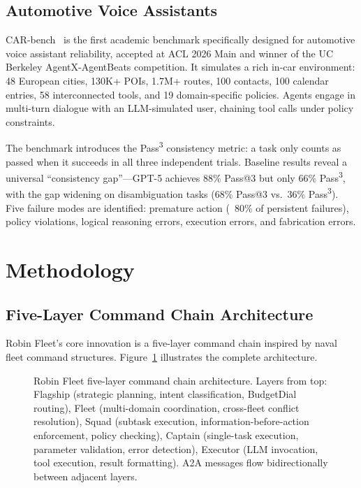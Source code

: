 \documentclass{article}
\begin{document}
\subsection{Automotive Voice Assistants}

CAR-bench~\cite{carbench2026} is the first academic benchmark specifically designed for automotive voice assistant reliability, accepted at ACL 2026 Main and winner of the UC Berkeley AgentX-AgentBeats competition. It simulates a rich in-car environment: 48 European cities, 130K+ POIs, 1.7M+ routes, 100 contacts, 100 calendar entries, 58 interconnected tools, and 19 domain-specific policies. Agents engage in multi-turn dialogue with an LLM-simulated user, chaining tool calls under policy constraints.

The benchmark introduces the Pass\textsuperscript{3} consistency metric: a task only counts as passed when it succeeds in all three independent trials. Baseline results reveal a universal ``consistency gap''---GPT-5 achieves 88\% Pass@3 but only 66\% Pass\textsuperscript{3}, with the gap widening on disambiguation tasks (68\% Pass@3 vs.\ 36\% Pass\textsuperscript{3}). Five failure modes are identified: premature action (~80\% of persistent failures), policy violations, logical reasoning errors, execution errors, and fabrication errors.

\section{Methodology}

\subsection{Five-Layer Command Chain Architecture}

Robin Fleet's core innovation is a five-layer command chain inspired by naval fleet command structures. Figure~\ref{fig:architecture} illustrates the complete architecture.


\begin{figure}[t]
    \centering
    \caption{Robin Fleet five-layer command chain architecture. Layers from top: Flagship (strategic planning, intent classification, BudgetDial routing), Fleet (multi-domain coordination, cross-fleet conflict resolution), Squad (subtask execution, information-before-action enforcement, policy checking), Captain (single-task execution, parameter validation, error detection), Executor (LLM invocation, tool execution, result formatting). A2A messages flow bidirectionally between adjacent layers.}
    \label{fig:architecture}
\end{figure}
\end{document}
